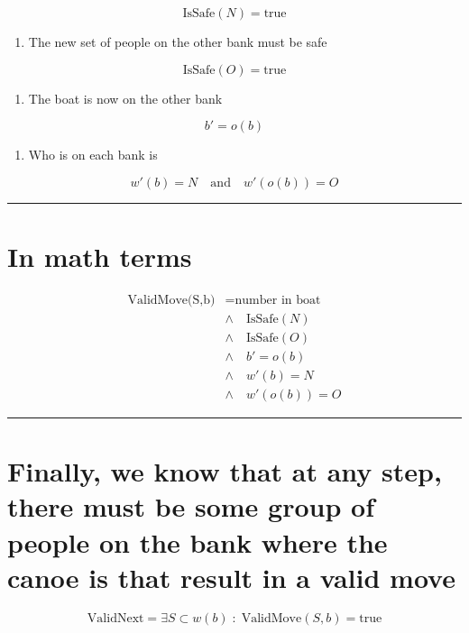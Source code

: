 \documentclass{article}
\begin{document}
\[\text{IsSafe}(N) = \text{true}\]

\begin{enumerate}
\def\labelenumi{\arabic{enumi}.}
\setcounter{enumi}{2}

\item
  The new set of people on the other bank must be safe
\end{enumerate}

\[\text{IsSafe}(O) = \text{true}\]

\begin{enumerate}
\def\labelenumi{\arabic{enumi}.}
\setcounter{enumi}{3}

\item
  The boat is now on the other bank
\end{enumerate}

\[b' = o(b)\]

\begin{enumerate}
\def\labelenumi{\arabic{enumi}.}
\setcounter{enumi}{4}

\item
  Who is on each bank is
\end{enumerate}

\[w'(b) = N \quad \text{and} \quad w'(o(b)) = O\]

\begin{center}\rule{0.5\linewidth}{0.5pt}\end{center}

\section{In math terms}\label{in-math-terms}

\[
\begin{array}{rl}
\text{ValidMove(S,b)} & = \text{number in boat} \\
    & \wedge\quad \text{IsSafe}(N) \\
    & \wedge \quad \text{IsSafe}(O) \\
    & \wedge \quad b' = o(b) \\
    & \wedge \quad w'(b) = N \\
    & \wedge \quad w'(o(b)) = O 
\end{array}
\]

\begin{center}\rule{0.5\linewidth}{0.5pt}\end{center}

\section{Finally, we know that at any step, there must be some group of
people on the bank where the canoe is that result in a valid
move}\label{finally-we-know-that-at-any-step-there-must-be-some-group-of-people-on-the-bank-where-the-canoe-is-that-result-in-a-valid-move}

\[\text{ValidNext} = \exists S \subset w(b) \; : \;  \text{ValidMove}(S,b) = \text{true}\]
\end{document}
